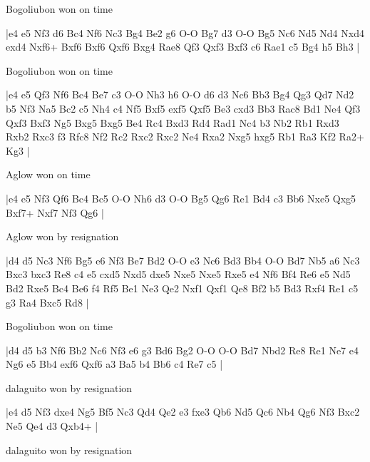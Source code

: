 \showboard

Bogoliubon won on time

\makegametitle
|e4 e5 Nf3 d6 Bc4 Nf6 Nc3 Bg4 Be2 g6 O-O Bg7 d3 O-O Bg5 Nc6 Nd5 Nd4 Nxd4 exd4 Nxf6+ Bxf6 Bxf6 Qxf6 Bxg4 Rae8 Qf3 Qxf3 Bxf3 c6 Rae1 c5 Bg4 h5 Bh3  |

\showboard

Bogoliubon won on time

\makegametitle
|e4 e5 Qf3 Nf6 Bc4 Be7 c3 O-O Nh3 h6 O-O d6 d3 Nc6 Bb3 Bg4 Qg3 Qd7 Nd2 b5 Nf3 Na5 Bc2 c5 Nh4 c4 Nf5 Bxf5 exf5 Qxf5 Be3 cxd3 Bb3 Rac8 Bd1 Ne4 Qf3 Qxf3 Bxf3 Ng5 Bxg5 Bxg5 Be4 Rc4 Bxd3 Rd4 Rad1 Nc4 b3 Nb2 Rb1 Rxd3 Rxb2 Rxc3 f3 Rfc8 Nf2 Rc2 Rxc2 Rxc2 Ne4 Rxa2 Nxg5 hxg5 Rb1 Ra3 Kf2 Ra2+ Kg3  |

\showboard

Aglow won on time

\makegametitle
|e4 e5 Nf3 Qf6 Bc4 Bc5 O-O Nh6 d3 O-O Bg5 Qg6 Re1 Bd4 c3 Bb6 Nxe5 Qxg5 Bxf7+ Nxf7 Nf3 Qg6  |

\showboard

Aglow won by resignation

\makegametitle
|d4 d5 Nc3 Nf6 Bg5 e6 Nf3 Be7 Bd2 O-O e3 Nc6 Bd3 Bb4 O-O Bd7 Nb5 a6 Nc3 Bxc3 bxc3 Re8 c4 e5 cxd5 Nxd5 dxe5 Nxe5 Nxe5 Rxe5 e4 Nf6 Bf4 Re6 e5 Nd5 Bd2 Rxe5 Bc4 Be6 f4 Rf5 Be1 Ne3 Qe2 Nxf1 Qxf1 Qe8 Bf2 b5 Bd3 Rxf4 Re1 c5 g3 Ra4 Bxc5 Rd8  |

\showboard

Bogoliubon won on time

\makegametitle
|d4 d5 b3 Nf6 Bb2 Nc6 Nf3 e6 g3 Bd6 Bg2 O-O O-O Bd7 Nbd2 Re8 Re1 Ne7 e4 Ng6 e5 Bb4 exf6 Qxf6 a3 Ba5 b4 Bb6 c4 Re7 c5  |

\showboard

dalaguito won by resignation

\makegametitle
|e4 d5 Nf3 dxe4 Ng5 Bf5 Nc3 Qd4 Qe2 e3 fxe3 Qb6 Nd5 Qc6 Nb4 Qg6 Nf3 Bxc2 Ne5 Qe4 d3 Qxb4+  |

\showboard

dalaguito won by resignation

